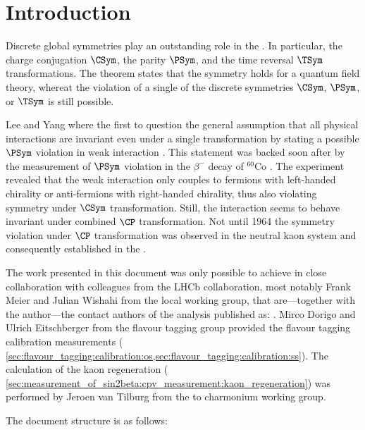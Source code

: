 
\chapter{Introduction}
\label{ch:introduction}

Discrete global symmetries play an outstanding role in the \SM. In particular,
the charge conjugation $\CSym$, the parity $\PSym$, and the time reversal
$\TSym$ transformations. The \CPT theorem \cite{set:cpt} states that the \CPT
symmetry holds for a quantum field theory, whereat the violation of a single of
the discrete symmetries $\CSym$, $\PSym$, or $\TSym$ is still possible.

Lee and Yang where the first to question the general assumption that all
physical interactions are invariant even under a single transformation by
stating a possible $\PSym$ violation in weak interaction \cite{Lee:1956qn}. This
statement was backed soon after by the measurement of $\PSym$ violation in the
$\beta^{-}$ decay of ${}^{60}\text{Co}$ \cite{Wu:1957my}. The experiment
revealed that the weak interaction only couples to fermions with left-handed
chirality or anti-fermions with right-handed chirality, thus also violating
symmetry under $\CSym$ transformation. Still, the interaction seems to behave
invariant under combined $\CP$ transformation. Not until 1964 the symmetry
violation under $\CP$ transformation was observed in the neutral kaon system
\cite{Christenson:1964fg} and consequently established in the \SM.


\par\noindent\newline
The work presented in this document was only possible to achieve in close
collaboration with colleagues from the \acs{LHCb} collaboration, most notably
Frank Meier and Julian Wishahi from the local working group, that are---together
with the author---the contact authors of the analysis published as:
. Mirco Dorigo and Ulrich Eitschberger from the flavour
tagging group provided the flavour tagging calibration measurements (\cf
\cref{sec:flavour_tagging:calibration:os,sec:flavour_tagging:calibration:ss}).
The calculation of the kaon regeneration (\cf
\cref{sec:measurement_of_sin2beta:cpv_measurement:kaon_regeneration}) was
performed by Jeroen van Tilburg from the \B to charmonium working group.

\par\noindent\newline
The document structure is as follows:

